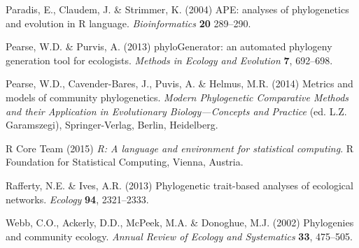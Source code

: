 \documentclass{bioinfo}
\begin{document}
\begin{thebibliography}{30}
 Paradis, E., Claudem, J. \& Strimmer, K.
  (2004) APE: analyses of phylogenetics and evolution in R
  language. \emph{Bioinformatics} \textbf{20} 289--290.

 Pearse, W.D. \& Purvis,
  A. (2013) phyloGenerator: an automated phylogeny generation tool for
  ecologists. \emph{Methods in Ecology and Evolution} \textbf{7},
  692--698.

Pearse, W.D., Cavender-Bares, J., Puvis, A. \& Helmus, M.R. (2014) Metrics and
  models of community phylogenetics. \emph{Modern Phylogenetic Comparative
  Methods and their Application in Evolutionary Biology---Concepts and
  Practice} (ed. L.Z. Garamszegi), Springer-Verlag, Berlin, Heidelberg.

{R Core Team} (2015) \emph{R: A language and environment for statistical
  computing}. R Foundation for Statistical Computing, Vienna, Austria.

 Rafferty, N.E. \&
  Ives, A.R. (2013) Phylogenetic trait-based analyses of ecological
  networks. \emph{Ecology} \textbf{94}, 2321--2333.

Webb, C.O., Ackerly, D.D., McPeek, M.A. \& Donoghue, M.J. (2002) Phylogenies
  and community ecology. \emph{Annual Review of Ecology and Systematics}
  \textbf{33}, 475--505.
\end{thebibliography}
\end{document}
